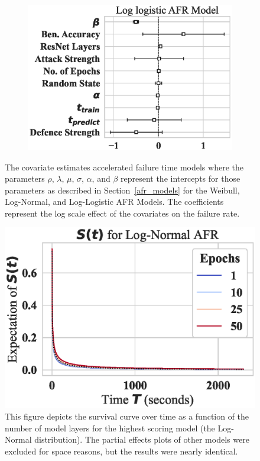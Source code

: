 \begin{figure}
\begin{subfigure}[t]{0.3\textwidth}
        \includegraphics[width=\textwidth]{cifar_log_logistic_aft.eps}
    \end{subfigure}
    
    \caption{The covariate estimates accelerated failure time models where the parameters $\rho$, $\lambda$, $\mu$, $\sigma$, $\alpha$, and $\beta$ represent the intercepts for those parameters as described in Section~\ref{afr_models} for the Weibull, Log-Normal, and Log-Logistic AFR Models. The coefficients represent the log scale effect of the covariates on the failure rate.}
    \label{fig:cifar_afr_models}
\end{figure}

\begin{figure}
    \centering\includegraphics[width=.5\textwidth]{cifar_log_normal_epochs_partial_effect.eps}
    \caption{This figure depicts the survival curve over time as a function of the number of model layers for the highest scoring model (the Log-Normal distribution). The partial effects plots of other models were excluded for space reasons, but the results were nearly identical.}
    \label{fig:cifar_layers}
\end{figure}


